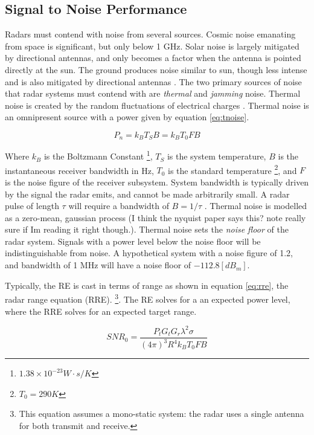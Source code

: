 \subsection{Signal to Noise Performance}

Radars must contend with noise from several sources. Cosmic noise emanating from space is significant, but only below 1 GHz. Solar noise is largely mitigated by directional antennas, and only becomes a factor when the antenna is pointed directly at the sun. The ground produces noise similar to sun, though less intense and is also mitigated by directional antennas \cite{POMR_Range_eq}. The two primary sources of noise that radar systems must contend with are \textit{thermal} and \textit{jamming} noise. Thermal noise is created by the random fluctuations of electrical charges \cite{N_Noise}. Thermal noise is an omnipresent source with a power given by equation \ref{eq:tnoise}\cite{POMR_Noise}\cite{J_Noise}.

\begin{equation}\label{eq:tnoise}
	P_n = k_B T_S B = k_B T_0 F B
\end{equation}

Where $k_B$ is the Boltzmann Constant \footnote{$1.38\times10^{-23} W\cdot s / K$}, $T_S$ is the system temperature, $B$ is the instantaneous receiver bandwidth in Hz, $T_0$ is the standard temperature \footnote{$T_0 = 290 K$}, and $F$ is the noise figure of the receiver subsystem. System bandwidth is typically driven by the signal the radar emits, and cannot be made arbitrarily small. A radar pulse of length $\tau$ will require a bandwidth of $B = 1/\tau$ \cite{POMR_Noise}. Thermal noise is modelled as a zero-mean, gaussian process (I think the nyquist paper says this? note really sure if Im reading it right though.). Thermal noise sets the \textit{noise floor} of the radar system. Signals with a power level below the noise floor will be indistinguishable from noise. A hypothetical system with a noise figure of 1.2, and bandwidth of 1 MHz will have a noise floor of $-112.8 [dB_m]$.

Typically, the RE is cast in terms of range as shown in  equation \ref{eq:rre}, the radar range equation (RRE).  \footnote{This equation assumes a mono-static system:  the radar uses a single antenna for both transmit and receive.}. The RE solves for a an expected power level, where the RRE solves for an expected target range.

\begin{equation}\label{eq:rre}
	SNR_0 = \frac{P_t G_t G_r \lambda^2 \sigma}{(4 \pi)^3 R^4 k_B T_0 F B}
\end{equation}

